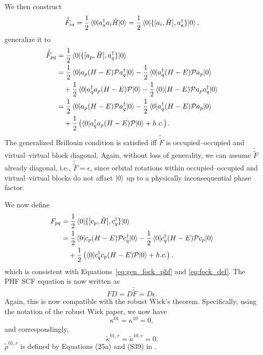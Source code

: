 \documentclass[11pt,letterpaper]{article}
\begin{document}
We then construct
\begin{equation}
  \tilde{\tilde{F}}_{ia}
  = \frac{1}{2} \braket{0|a^\dag_a a_i \tilde{H}|0}
  = \frac{1}{2} \braket{0|\{[a_i, \tilde{H}], a^\dag_a\}|0},
\end{equation}
generalize it to
\begin{subequations}
\label{eq:gen_fock_phf_mo}
\begin{align}
  \tilde{\tilde{F}}_{pq}
  &= \frac{1}{2} \braket{0|\{[a_p, \tilde{H}], a^\dag_q\}|0}\\
  \nonumber
  &= \frac{1}{2} \braket{0|a_p (H - E) \mathcal{P} a^\dag_q|0}
  - \frac{1}{2} \braket{0|a^\dag_q (H - E) \mathcal{P} a_p|0}\\
  &\quad
  + \frac{1}{2} \braket{0|a^\dag_q a_p (H - E) \mathcal{P}|0}
  - \frac{1}{2} \braket{0|(H - E) \mathcal{P} a_p a^\dag_q|0}\\
  \nonumber
  &= \frac{1}{2} \braket{0|a_p (H - E) \mathcal{P} a^\dag_q|0}
  - \frac{1}{2} \braket{0|a^\dag_q (H - E) \mathcal{P} a_p|0}\\
  &\quad+ \frac{1}{2} \left(
    \braket{0|a^\dag_q a_p (H - E) \mathcal{P}|0}
    + h.c.
  \right).
\end{align}
\end{subequations}
The generalized Brillouin condition is satisfied iff $\tilde{\tilde{F}}$
is occupied--occupied and virtual--virtual block diagonal.
Again, without loss of generality, we can assume
$\tilde{\tilde{F}}$ already diagonal, i.e., $\tilde{\tilde{F}} = \epsilon$,
since orbital rotations within occupied--occupied and
virtual--virtual blocks do not affact $\ket{0}$ up to a
physically inconsequential phase factor.

We now define
\begin{subequations}
\begin{align}
  F_{pq}
  &= \frac{1}{2} \braket{0|\{[c_p, \tilde{H}], c^\dag_q\}|0}\\
  \nonumber
  &= \frac{1}{2} \braket{0|c_p (H - E) \mathcal{P} c^\dag_q|0}
  - \frac{1}{2} \braket{0|c^\dag_q (H - E) \mathcal{P} c_p|0}\\
  &\quad+ \frac{1}{2} \left(
    \braket{0|c^\dag_q c_p (H - E) \mathcal{P}|0}
    + h.c.
  \right).
\end{align}
\end{subequations}
which is consistent with Equations~\eqref{eq:gen_fock_phf} and \eqref{eq:fock_def}.
The PHF SCF equation is now written as
\begin{equation}
  F D = D \tilde{\tilde{F}} = D \epsilon.
\end{equation}
Again, this is now compatible with the robust Wick's theorem.
Specifically, using the notation of the robust Wick paper, we now have
\begin{equation}
  \kappa^{01} = \kappa^{10} = 0,
\end{equation}
and correspondingly,
\begin{equation}
  \tilde{\kappa}^{01,r} = \tilde{\kappa}^{10,r} = 0.
\end{equation}
$\tilde{\rho}^{01,r}$ is defined by Equations (25a) and (S39) in \cite{robustwick}.
\end{document}
